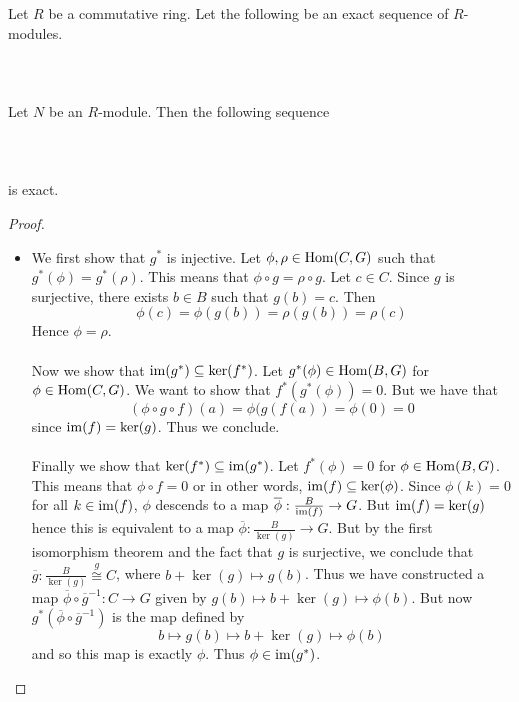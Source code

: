 \documentclass[a4paper]{article}
\begin{document}
\begin{prp}{}{} Let $R$ be a commutative ring. Let the following be an exact sequence of $R$-modules. \\~\\
\\~\\ Let $N$ be an $R$-module. Then the following sequence \\~\\
 \\~\\ 
is exact. \tcbline
\begin{proof}~\\
\begin{itemize}
\item We first show that $g^\ast$ is injective. Let $\phi,\rho\in\operatorname{Hom}(C,G)$ such that $g^\ast(\phi)=g^\ast(\rho)$. This means that $\phi\circ g=\rho\circ g$. Let $c\in C$. Since $g$ is surjective, there exists $b\in B$ such that $g(b)=c$. Then $$\phi(c)=\phi(g(b))=\rho(g(b))=\rho(c)$$ Hence $\phi=\rho$. \\~\\

Now we show that $\operatorname{im}(g^\ast)\subseteq\ker(f^\ast)$. Let $g^\ast(\phi)\in\operatorname{Hom}(B,G)$ for $\phi\in\operatorname{Hom}(C,G)$. We want to show that $f^\ast(g^\ast(\phi))=0$. But we have that $$(\phi\circ g\circ f)(a)=\phi(g(f(a))=\phi(0)=0$$ since $\operatorname{im}(f)=\ker(g)$. Thus we conclude. \\~\\

Finally we show that $\ker(f^\ast)\subseteq\operatorname{im}(g^\ast)$. Let $f^\ast(\phi)=0$ for $\phi\in\operatorname{Hom}(B,G)$. This means that $\phi\circ f=0$ or in other words, $\operatorname{im}(f)\subseteq\ker(\phi)$.
Since $\phi(k)=0$ for all $k\in\operatorname{im}(f)$, $\phi$ descends to a map $\overline{\phi}:\frac{B}{\operatorname{im}(f)}\to G$. But $\operatorname{im}(f)=\ker(g)$ hence this is equivalent to a map $\overline{\phi}:\frac{B}{\ker(g)}\to G$. But by the first isomorphism theorem and the fact that $g$ is surjective, we conclude that $\overline{g}:\frac{B}{\ker(g)}\overset{g}{\cong} C$, where $b+\ker(g)\mapsto g(b)$. Thus we have constructed a map $\overline{\phi}\circ\overline{g}^{-1}:C\to G$ given by $g(b)\mapsto b+\ker(g)\mapsto\phi(b)$. But now $g^\ast(\overline{\phi}\circ\overline{g}^{-1})$ is the map defined by $$b\mapsto g(b)\mapsto b+\ker(g)\mapsto\phi(b)$$ and so this map is exactly $\phi$. Thus $\phi\in\operatorname{im}(g^\ast)$. 
\end{itemize}
\end{proof}
\end{prp}
\end{document}
